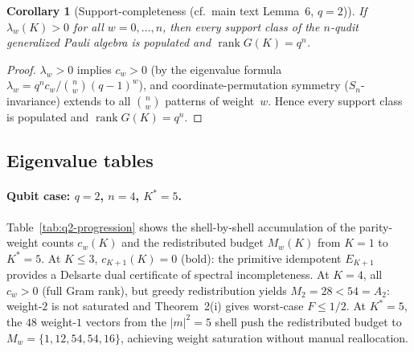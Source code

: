 \documentclass[twocolumn,prx,aps,superscriptaddress,longbibliography]{revtex4-2}
\newtheorem{corollary}[proposition]{Corollary}
\newcommand{\pclaim}[4]{}
\begin{document}
\pclaim{env:cor:support}{proved}{q>=2}{cor:support}%
\begin{corollary}[Support-completeness (cf.\ main text Lemma~6, $q = 2$)]
\label{cor:support}
If $\lambda_w(K) > 0$ for all $w = 0, \ldots, n$, then every
support class of the $n$-qudit generalized Pauli algebra is
populated and $\operatorname{rank} G(K) = q^n$.
\end{corollary}

\begin{proof}
$\lambda_w > 0$ implies $c_w > 0$ (by the eigenvalue
formula $\lambda_w = q^n c_w / \binom{n}{w}(q{-}1)^w$),
and coordinate-permutation symmetry ($S_n$-invariance)
extends to all $\binom{n}{w}$ patterns of weight~$w$.
Hence every support class is populated and $\operatorname{rank} G(K) = q^n$.
\end{proof}

\subsection{Eigenvalue tables}
\label{sec:eigenvalues}

\paragraph{Qubit case: $q = 2$, $n = 4$, $K^* = 5$.}
Table~\ref{tab:q2-progression} shows the shell-by-shell
accumulation of the parity-weight counts $c_w(K)$ and
the redistributed budget $M_w(K)$ from $K = 1$ to $K^* = 5$.
At $K \le 3$, $c_{K+1}(K) = 0$ (bold): the primitive idempotent
$E_{K+1}$ provides a Delsarte dual certificate of spectral
incompleteness.
At $K = 4$, all $c_w > 0$ (full Gram rank), but greedy
redistribution yields $M_2 = 28 < 54 = A_2$: weight-$2$
is not saturated and Theorem~2(i) gives worst-case $F \le 1/2$.
At $K^* = 5$, the $48$ weight-$1$ vectors from the $|m|^2 = 5$ shell
push the redistributed budget to $M_w = \{1, 12, 54, 54, 16\}$,
achieving weight saturation without manual reallocation.
\end{document}
